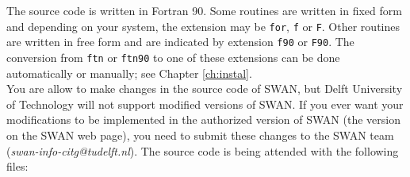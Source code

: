 \documentclass[12pt]{book}
\begin{document}
\noindent
The source code is written in Fortran 90. Some routines are written in fixed form and depending on your system,
the extension may be {\tt for}, {\tt f} or {\tt F}. Other routines are written in free form and are indicated by
extension {\tt f90} or {\tt F90}. The conversion from {\tt ftn} or {\tt ftn90} to one of these extensions
can be done automatically or manually; see Chapter \ref{ch:instal}.
\\[2ex]
\noindent
You are allow to make changes in the source code of SWAN, but Delft University of Technology
will not support modified versions of SWAN. If you ever want your modifications to be
implemented in the authorized version of SWAN (the version on the SWAN web page), you need
to submit these changes to the SWAN team ({\it swan-info-citg@tudelft.nl}).
\newpage
\noindent
The source code is being attended with the following files:
\end{document}
